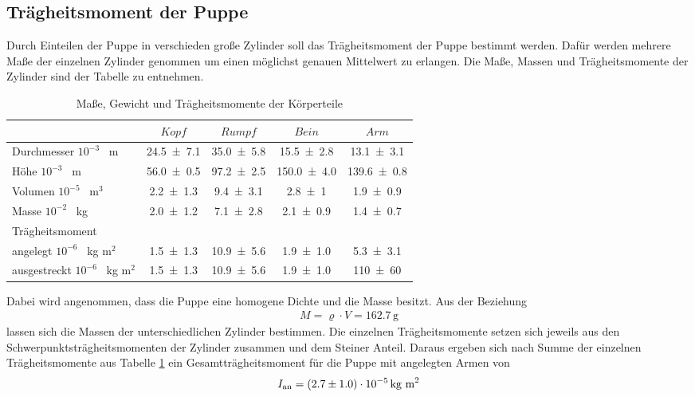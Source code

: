 \subsection{Trägheitsmoment der Puppe}
Durch Einteilen der Puppe in verschieden große Zylinder soll das Trägheitsmoment der Puppe bestimmt werden. Dafür werden mehrere Maße der einzelnen Zylinder genommen um einen möglichst genauen Mittelwert zu erlangen. Die Maße, Massen und Trägheitsmomente der Zylinder sind der Tabelle zu entnehmen.
\begin{table}
	\centering
	\caption{Maße, Gewicht und Trägheitsmomente der Körperteile}
	\label{tab:Puppe}
	\begin{tabular}{l c c c c}
		\toprule
		$  $ & $Kopf$ & $Rumpf$ & $Bein$ & $Arm$ \\
		\midrule
		Durchmesser 	$10^{-3}$ \, m	& \num{24.5 +- 7.1}	&\num{35.0 +- 5.8}      &\num{15.5 +- 2.8}	&\num{13.1 +- 3.1}	\\
		Höhe 		$10^{-3}$ \, m	& \num{56.0 +- 0.5}	&\num{97.2 +- 2.5}      &\num{150.0 +- 4.0}	&\num{139.6 +- 0.8}	\\
		Volumen		$10^{-5}$ \, m$^3$& \num{2.2 +- 1.3}	&\num{9.4 +-3.1}	&\num{2.8 +- 1}		&\num{1.9 +- 0.9}	\\
		Masse		$10^{-2}$ \, kg	& \num{2.0 +- 1.2}      &\num{7.1 +- 2.8}       &\num{2.1 +- 0.9}       &\num{1.4 +- 0.7}       \\
		Trägheitsmoment			&	&	&	&	\\
		angelegt	$10^{-6}$ \, kg \cdot m$^2$	& \num{1.5 +- 1.3}     	&\num{10.9 +- 5.6}       &\num{1.9 +- 1.0}       &\num{5.3 +- 3.1}      \\
		ausgestreckt	$10^{-6}$ \, kg \cdot m$^2$	& \num{1.5 +- 1.3}    	&\num{10.9 +- 5.6}       &\num{1.9 +- 1.0}       &\num{110 +- 60}       \\
		\bottomrule
	\end{tabular}
\end{table}
Dabei wird angenommen, dass die Puppe eine homogene Dichte und die Masse besitzt. Aus der Beziehung
\begin{align}
	M = \varrho \cdot V = 162.7 \, \text{g}
\end{align}
lassen sich die Massen der unterschiedlichen Zylinder bestimmen. Die einzelnen Trägheitsmomente setzen sich jeweils aus den Schwerpunktsträgheitsmomenten der Zylinder zusammen und dem Steiner Anteil. Daraus ergeben sich nach Summe der einzelnen Trägheitsmomente aus Tabelle \ref{tab:Puppe} ein Gesamtträgheitsmoment für die Puppe mit angelegten Armen von
\begin{align}
	I_\text{an} = (\num{2.7 +- 1.0}) \cdot 10^{-5} \, \text{kg m}^2
\end{align}
